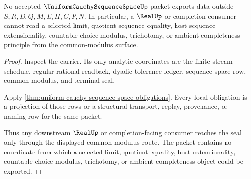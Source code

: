 \begin{theorem}
\label{thm:uniform-cauchy-sequence-space-nonescape}
No accepted $\UniformCauchySequenceSpaceUp$ packet exports data outside $S,R,D,Q,M,E,H,C,P,N$. In particular, a $\RealUp$ or completion consumer cannot read a selected limit, quotient sequence equality, host sequence extensionality, countable-choice modulus, trichotomy, or ambient completeness principle from the common-modulus surface.
\end{theorem}
\begin{proof}
Inspect the carrier. Its only analytic coordinates are the finite stream schedule, regular rational readback, dyadic tolerance ledger, sequence-space row, common modulus, and terminal seal.

Apply \autoref{thm:uniform-cauchy-sequence-space-obligations}. Every local obligation is a projection of those rows or a structural transport, replay, provenance, or naming row for the same packet.

Thus any downstream $\RealUp$ or completion-facing consumer reaches the seal only through the displayed common-modulus route. The packet contains no coordinate from which a selected limit, quotient equality, host extensionality, countable-choice modulus, trichotomy, or ambient completeness object could be exported.
\end{proof}




